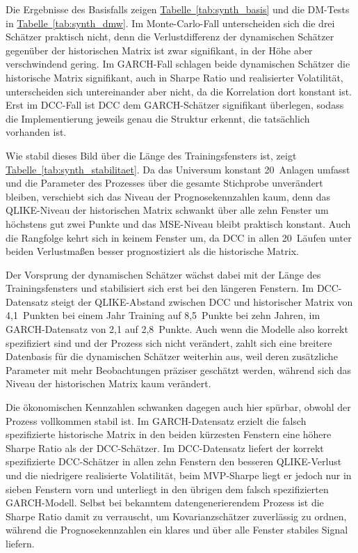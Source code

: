 Die Ergebnisse des Basisfalls zeigen \hyperref[tab:synth_basis]{Tabelle~\ref*{tab:synth_basis}} und die DM-Tests in \hyperref[tab:synth_dmw]{Tabelle~\ref*{tab:synth_dmw}}.
Im Monte-Carlo-Fall unterscheiden sich die drei Schätzer praktisch nicht, denn die Verlustdifferenz der dynamischen Schätzer gegenüber der historischen Matrix ist zwar signifikant, in der Höhe aber verschwindend gering.
Im GARCH-Fall schlagen beide dynamischen Schätzer die historische Matrix signifikant, auch in Sharpe Ratio und realisierter Volatilität, unterscheiden sich untereinander aber nicht, da die Korrelation dort konstant ist.
Erst im DCC-Fall ist DCC dem GARCH-Schätzer signifikant überlegen, sodass die Implementierung jeweils genau die Struktur erkennt, die tatsächlich vorhanden ist.





Wie stabil dieses Bild über die Länge des Trainingsfensters ist, zeigt \hyperref[tab:synth_stabilitaet]{Tabelle~\ref*{tab:synth_stabilitaet}}.
Da das Universum konstant 20~Anlagen umfasst und die Parameter des Prozesses über die gesamte Stichprobe unverändert bleiben, verschiebt sich das Niveau der Prognosekennzahlen kaum, denn das QLIKE-Niveau der historischen Matrix schwankt über alle zehn Fenster um höchstens gut zwei Punkte und das MSE-Niveau bleibt praktisch konstant.
Auch die Rangfolge kehrt sich in keinem Fenster um, da DCC in allen 20~Läufen unter beiden Verlustmaßen besser prognostiziert als die historische Matrix.

Der Vorsprung der dynamischen Schätzer wächst dabei mit der Länge des Trainingsfensters und stabilisiert sich erst bei den längeren Fenstern.
Im DCC-Datensatz steigt der QLIKE-Abstand zwischen DCC und historischer Matrix von 4,1~Punkten bei einem Jahr Training auf 8,5~Punkte bei zehn Jahren, im GARCH-Datensatz von 2,1 auf 2,8~Punkte.
Auch wenn die Modelle also korrekt spezifiziert sind und der Prozess sich nicht verändert, zahlt sich eine breitere Datenbasis für die dynamischen Schätzer weiterhin aus, weil deren zusätzliche Parameter mit mehr Beobachtungen präziser geschätzt werden, während sich das Niveau der historischen Matrix kaum verändert.



Die ökonomischen Kennzahlen schwanken dagegen auch hier spürbar, obwohl der Prozess vollkommen stabil ist.
Im GARCH-Datensatz erzielt die falsch spezifizierte historische Matrix in den beiden kürzesten Fenstern eine höhere Sharpe Ratio als der DCC-Schätzer.
Im DCC-Datensatz liefert der korrekt spezifizierte DCC-Schätzer in allen zehn Fenstern den besseren QLIKE-Verlust und die niedrigere realisierte Volatilität, beim MVP-Sharpe liegt er jedoch nur in sieben Fenstern vorn und unterliegt in den übrigen dem falsch spezifizierten GARCH-Modell.
Selbst bei bekanntem datengenerierendem Prozess ist die Sharpe Ratio damit zu verrauscht, um Kovarianzschätzer zuverlässig zu ordnen, während die Prognosekennzahlen ein klares und über alle Fenster stabiles Signal liefern.

